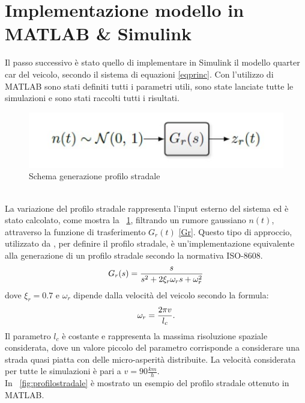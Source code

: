 \section{Implementazione modello in MATLAB \& Simulink}
Il passo successivo è stato quello di implementare in Simulink il modello quarter car del veicolo, secondo il sistema di equazioni \ref{eqprinc}. Con l'utilizzo di MATLAB sono stati definiti tutti i parametri utili, sono state lanciate tutte le simulazioni e sono stati raccolti tutti i risultati.\\
\begin{figure}[hbt]
	\centering
	\includegraphics[scale=0.5]{figure/zr.jpg}
	\caption{Schema generazione profilo stradale}
	\label{fig:zr}
\end{figure}\\
La variazione del profilo stradale rappresenta l'input esterno del sistema ed è stato calcolato, come mostra la \figurename \ \ref{fig:zr}, filtrando un rumore gaussiano $n(t)$, attraverso la funzione di trasferimento $G_r(t)$ \eqref{Gr}. Questo tipo di approccio, utilizzato da \cite{controlMRdampers}, per definire il profilo stradale, è un'implementazione equivalente alla generazione di un profilo stradale secondo la normativa ISO-8608.
\begin{equation}
	\centering
	G_r(s) = \frac{s}{s^2 + 2\xi_r\omega_rs + \omega_r^2}
	\label{Gr}
\end{equation}
dove $\xi_r = 0.7$ e $\omega_r$ dipende dalla velocità del veicolo secondo la formula:
\begin{equation}
	\centering
	\omega_r = \frac{2\pi v}{l_c}
	.
	\label{omega_r}
\end{equation}
Il parametro $l_c$ è costante e rappresenta la massima risoluzione spaziale considerata, dove un valore piccolo del parametro corrisponde a considerare una strada quasi piatta con delle micro-asperità distribuite. La velocità considerata per tutte le simulazioni è pari a $v = 90\frac{km}{h}$.\\
In \figurename \ \ref{fig:profilostradale} è mostrato un esempio del profilo stradale ottenuto in MATLAB.
